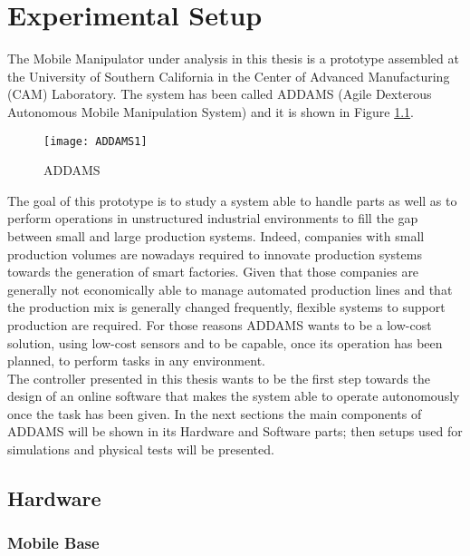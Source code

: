 
\chapter{Experimental Setup}
\label{chapter6}

The Mobile Manipulator under analysis in this thesis is a prototype assembled at the University of Southern California in the Center of Advanced Manufacturing (CAM) Laboratory. The system has been called ADDAMS (Agile  Dexterous  Autonomous  Mobile Manipulation System) and it is shown in Figure \ref{imgADDAMS1}.

\begin{figure}[h!] 
\texttt{[image: ADDAMS1]}
\centering
\caption{ADDAMS}
\label{imgADDAMS1}
\end{figure}

The goal of this prototype is to study a system able to handle parts as well as to perform operations in unstructured industrial environments to fill the gap between small and large production systems. Indeed, companies with small production volumes are nowadays required to innovate production systems towards the generation of smart factories. Given that those companies are generally not economically able to manage automated production lines and that the production mix is generally changed frequently, flexible systems to support production are required. For those reasons ADDAMS wants to be a low-cost solution, using low-cost sensors and to be capable, once its operation has been planned, to perform tasks in any environment. \\


The controller presented in this thesis wants to be the first step towards the design of an online software that makes the system able to operate autonomously once the task has been given. In the next sections the main components of ADDAMS will be shown in its Hardware and Software parts; then setups used for simulations and physical tests will be presented. 
\section{Hardware}

\subsection{Mobile Base}

